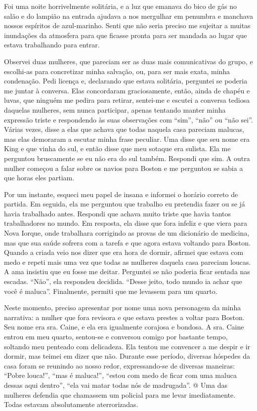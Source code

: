 Foi uma noite horrivelmente solitária, e a luz que emanava do bico de
gás no salão e do lampião na entrada ajudava a nos mergulhar em penumbra
e manchava nossos espíritos de azul-marinho. Senti que não seria preciso
me sujeitar a muitas inundações da atmosfera para que ficasse pronta
para ser mandada ao lugar que estava trabalhando para entrar.

Observei
duas mulheres, que pareciam ser as duas mais comunicativas do grupo, e
escolhi-as para concretizar minha salvação, ou, para ser mais exata,
minha condenação. Pedi licença e, declarando que estava solitária,
perguntei se poderia me juntar à conversa. Elas concordaram
graciosamente, então, ainda de chapéu e luvas, que ninguém me pedira
para retirar, sentei-me e escutei a conversa tediosa daquelas mulheres,
sem nunca participar, apenas tentando manter minha expressão triste e
respondendo às suas observações com ``sim'', ``não'' ou ``não sei''.
Várias vezes, disse a elas que achava que todas naquela casa pareciam
malucas, mas elas demoraram a escutar minha frase peculiar. Uma disse
que seu nome era King e que vinha do sul, e então disse que meu sotaque
era sulista. Ela me perguntou bruscamente se eu não era do sul também.
Respondi que sim. A outra mulher começou a falar sobre os navios para
Boston e me perguntou se sabia a que horas eles partiam.

Por um instante, esqueci meu papel de insana e informei o horário
correto de partida. Em seguida, ela me perguntou que trabalho eu
pretendia fazer ou se já havia trabalhado antes. Respondi que achava
muito triste que havia tantos trabalhadores no mundo. Em resposta, ela
disse que fora infeliz e que viera para Nova Iorque, onde trabalhara
corrigindo as provas de um dicionário de medicina, mas que sua saúde
sofrera com a tarefa e que agora estava voltando para Boston. Quando a
criada veio nos dizer que era hora de dormir, afirmei que estava com
medo e repeti mais uma vez que todas as mulheres daquela casa pareciam
loucas. A ama insistiu que eu fosse me deitar. Perguntei se não poderia
ficar sentada nas escadas. ``Não'', ela respondeu decidida. 
``Desse jeito, todo mundo ia achar que você é maluca''. Finalmente,
permiti que me levassem para um quarto.

Neste momento, preciso apresentar por nome uma nova personagem da minha
narrativa: a mulher que fora revisora e que estava prestes a voltar para
Boston. Seu nome era sra. Caine, e ela era igualmente corajosa e
bondosa. A sra. Caine entrou em meu quarto, sentou-se e conversou comigo
por bastante tempo, soltando meu penteado com delicadeza. Ela tentou me
convencer a me despir e ir dormir, mas teimei em dizer que não. Durante
esse período, diversas hóspedes da casa foram se reunindo ao nosso
redor, expressando-se de diversas maneiras: ``Pobre louca!'', ``mas é
maluca!'', ``estou com medo de ficar com uma maluca dessas aqui dentro'',
``ela vai matar todas nós de madrugada''. @ Uma das mulheres defendia
que chamassem um policial para me levar imediatamente. Todas estavam
absolutamente aterrorizadas.

